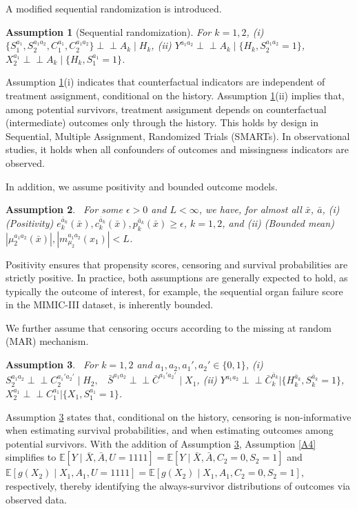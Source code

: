 \documentclass{article}
\newcommand{\E}{\mathbb{E}}
\newcommand{\indep}{{\perp\!\!\!\!\perp}}
\newtheorem{assumption}{Assumption}
\begin{document}
A modified sequential randomization is introduced.		

\begin{assumption}[Sequential randomization] \label{A3}
	For $k=1,2$, 
	(i) $\{S_1^{a_1}, S_2^{a_1a_2}, C_1^{a_1}, C_2^{a_1a_2}\} \indep A_k \mid H_{k}$, 
	(ii) $Y^{a_1a_2} \indep A_k \mid \{H_{k}, S_2^{a_1a_2}=1\}$, 
	$X_2^{a_1} \indep A_k \mid \{H_{k}, S_1^{a_1}=1\}$.
\end{assumption}
Assumption \ref{A3}(i) indicates that counterfactual indicators are independent of treatment assignment, conditional on the history. Assumption \ref{A3}(ii) implies that, among potential survivors, treatment assignment depends on counterfactual (intermediate) outcomes only through the history. 
This holds by design in Sequential, Multiple Assignment, Randomized Trials (SMARTs). In observational studies, it holds when all confounders of outcomes and missingness indicators are observed.

In addition, we assume positivity and bounded outcome models.
%
\begin{assumption} \  \label{A8}
	For some $\epsilon > 0$ and $L<\infty$, we have, for almost all $\bar x$, $\bar a$, 
	\;\textnormal{(i)} (Positivity)
			$e_k^{\bar a_k}(\bar x), c_k^{\bar a_k}(\bar x), p_k^{\bar a_k}(\bar x) \ge \epsilon$, $k=1,2$, and 
	\;\textnormal{(ii)} (Bounded mean)
			$|\mu_2^{a_1a_2}(\bar x)|, |m_{\mu_2}^{a_1a_2}(x_1)| < L$.
\end{assumption}
Positivity ensures that propensity scores, censoring and survival probabilities are strictly positive.  
In practice, both assumptions are generally expected to hold, as typically the outcome of interest, for example, the sequential organ failure score in the MIMIC-III dataset, is inherently bounded.

We further assume that censoring occurs according to the missing at random (MAR) mechanism.
\begin{assumption} \ \label{A5}
	For $k=1,2$ and $a_1, a_2, a_1', a_2' \in \{0,1\}$,  
	\;\textnormal{(i)} $S_2^{a_1a_2} \indep C_2^{a_1'a_2'} \mid H_2,$~ $\bar S^{a_1a_2} \indep \bar C^{a_1'a_2'} \mid X_1$,
	\;\textnormal{(ii)} $Y^{a_1a_2} \indep \bar C_k^{\bar a_k} | \{H_{k}^{\bar a_{k}}, S_k^{\bar a_k}=1\}$,
				$X_2^{a_1} \indep C_1^{a_1} | \{X_1, S_1^{a_1}=1\}$.
\end{assumption}
Assumption \ref{A5} states that, conditional on the history, censoring is non-informative when estimating survival probabilities, and when estimating outcomes among potential survivors. 
With the addition of Assumption \ref{A5}, Assumption \ref{A4} simplifies to $\mathbb{E}[Y \mid \bar{X}, \bar{A}, U = 1111] = \mathbb{E}[Y \mid \bar{X}, \bar{A}, C_2 = 0, S_2 = 1]$ and $\E[g(X_2) \mid X_1, A_1, U = 1111] = \E[g(X_2) \mid X_1, A_1, C_2 = 0, S_2 = 1]$, respectively, thereby identifying the always-survivor distributions of outcomes via observed data.
	
\end{document}
